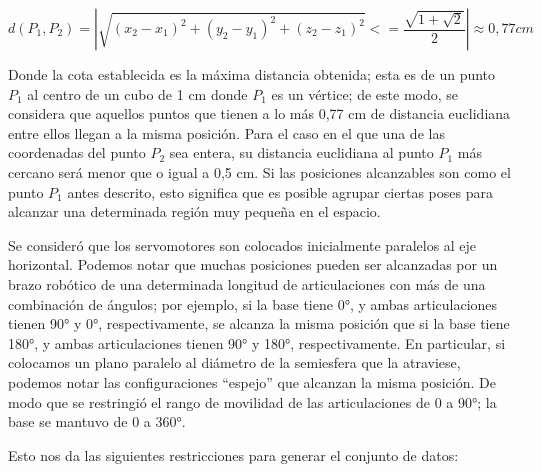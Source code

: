 \begin{equation}
	d(P_1, P_2) = |\sqrt{(x_2 - x_1)^2 + (y_2 - y_1)^2 + (z_2 - z_1)^2} <= \frac{\sqrt{1 + \sqrt{2}}}{2}| \approx 0,77 cm
\end{equation}

Donde la cota establecida es la máxima distancia obtenida; esta es de un punto $P_1$ al centro de un cubo de 1 cm donde $P_1$ es un vértice; de este modo, se considera que aquellos puntos que tienen a lo más 0,77 cm de distancia euclidiana entre ellos llegan a la misma posición. Para el caso en el que una de las coordenadas del punto $P_2$ sea entera, su distancia euclidiana al punto $P_1$ más cercano será menor que o igual a 0,5 cm. Si las posiciones alcanzables son como el punto $P_1$ antes descrito, esto significa que es posible agrupar ciertas poses para alcanzar una determinada región muy pequeña en el espacio.

Se consideró que los servomotores son colocados inicialmente paralelos al eje horizontal. Podemos notar que muchas posiciones pueden ser alcanzadas por un brazo robótico de una determinada longitud de articulaciones con más de una combinación de ángulos; por ejemplo, si la base tiene 0°, y ambas articulaciones tienen 90° y 0°, respectivamente, se alcanza la misma posición que si la base tiene 180°, y ambas articulaciones tienen 90° y 180°, respectivamente. En particular, si colocamos un plano paralelo al diámetro de la semiesfera que la atraviese, podemos notar las configuraciones ``espejo'' que alcanzan la misma posición. De modo que se restringió el rango de movilidad de las articulaciones de 0 a 90°; la base se mantuvo de 0 a 360°. 


Esto nos da las siguientes restricciones para generar el conjunto de datos:


